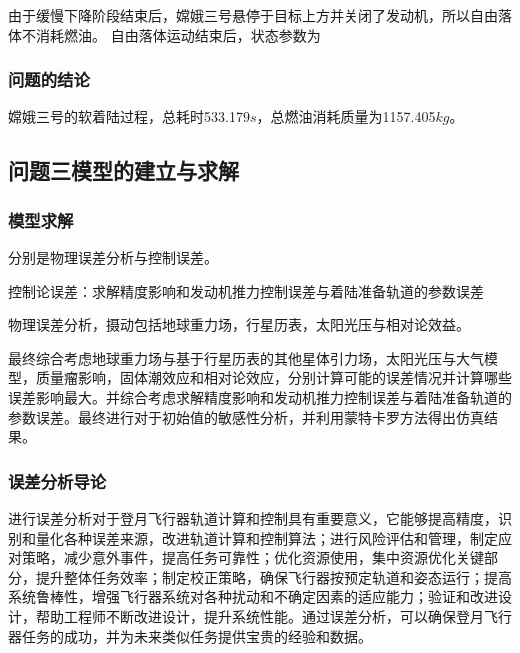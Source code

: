 \documentclass{ctexart}
\begin{document}
由于缓慢下降阶段结束后，嫦娥三号悬停于目标上方并关闭了发动机，所以自由落体不消耗燃油。
自由落体运动结束后，状态参数为

\begin{center}
\end{center}
\subsubsection{问题的结论}
嫦娥三号的软着陆过程，总耗时533.179\(s\)，总燃油消耗质量为1157.405\(kg\)。
    \subsection{问题三模型的建立与求解}
\subsubsection{模型求解}
分别是物理误差分析与控制误差。

控制论误差：求解精度影响和发动机推力控制误差与着陆准备轨道的参数误差

物理误差分析，摄动包括地球重力场，行星历表，太阳光压与相对论效益。

最终综合考虑地球重力场与基于行星历表的其他星体引力场，太阳光压与大气模型，质量瘤影响，固体潮效应和相对论效应，分别计算可能的误差情况并计算哪些误差影响最大。并综合考虑求解精度影响和发动机推力控制误差与着陆准备轨道的参数误差。最终进行对于初始值的敏感性分析，并利用蒙特卡罗方法得出仿真结果。
\subsubsection{误差分析导论}
进行误差分析对于登月飞行器轨道计算和控制具有重要意义，它能够提高精度，识别和量化各种误差来源，改进轨道计算和控制算法；进行风险评估和管理，制定应对策略，减少意外事件，提高任务可靠性；优化资源使用，集中资源优化关键部分，提升整体任务效率；制定校正策略，确保飞行器按预定轨道和姿态运行；提高系统鲁棒性，增强飞行器系统对各种扰动和不确定因素的适应能力；验证和改进设计，帮助工程师不断改进设计，提升系统性能。通过误差分析，可以确保登月飞行器任务的成功，并为未来类似任务提供宝贵的经验和数据。
\end{document}
